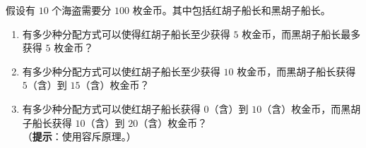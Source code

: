 \begin{exercise}
    假设有 $10$ 个海盗需要分 $100$ 枚金币。其中包括红胡子船长和黑胡子船长。
    \begin{enumerate}[label=(\alph*)]
        \item 有多少种分配方式可以使得红胡子船长至少获得 $5$ 枚金币，而黑胡子船长最多获得 $5$ 枚金币？
        \item 有多少种分配方式可以使红胡子船长至少获得 $10$ 枚金币，而黑胡子船长获得 $5$（含）到 $15$（含）枚金币？
        \item 有多少种分配方式可以使红胡子船长获得 $0$（含）到 $10$（含）枚金币，而黑胡子船长获得 $10$（含）到 $20$（含）枚金币？\\
        （\textbf{提示}：使用容斥原理。）
    \end{enumerate}
\end{exercise}